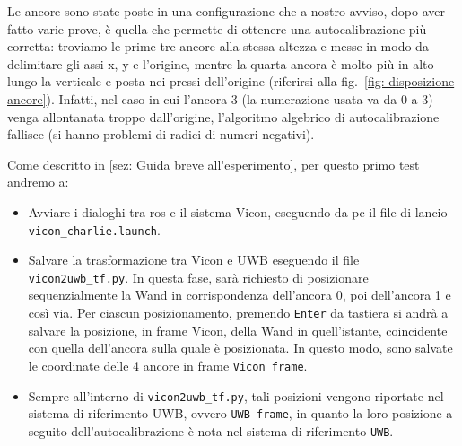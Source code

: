 
Le ancore sono state poste in una configurazione che a nostro avviso, dopo aver fatto varie prove, è quella che permette di ottenere una autocalibrazione più corretta: troviamo le prime tre ancore alla stessa altezza e messe in modo da delimitare gli assi x, y e l'origine, mentre la quarta ancora è molto pi\`u in alto lungo la verticale e posta nei pressi dell'origine (riferirsi alla fig.~\ref{fig: disposizione ancore}).
Infatti, nel caso in cui l'ancora 3 (la numerazione usata va da 0 a 3) venga allontanata troppo dall'origine, l'algoritmo algebrico di autocalibrazione fallisce (si hanno problemi di radici di numeri negativi).

Come descritto in \ref{sez: Guida breve all'esperimento}, per questo primo test andremo a:
\begin{itemize}
	\item Avviare i dialoghi tra ros e il sistema Vicon, eseguendo da pc il file di lancio \verb|vicon_charlie.launch|.
	
	\item Salvare la trasformazione tra Vicon e UWB eseguendo il file \verb|vicon2uwb_tf.py|. In questa fase, sarà richiesto di posizionare sequenzialmente la Wand in corrispondenza dell'ancora 0, poi dell'ancora 1 e così via. 
	Per ciascun posizionamento, premendo \verb|Enter| da tastiera si andrà a salvare la posizione, in frame Vicon, della Wand in quell'istante, coincidente con quella dell'ancora sulla quale è posizionata. In questo modo, sono salvate le coordinate delle 4 ancore in frame \verb|Vicon frame|.
	
	\item Sempre all'interno di \verb|vicon2uwb_tf.py|, tali posizioni vengono riportate nel sistema di riferimento UWB, ovvero \verb|UWB frame|, 
	in quanto la loro posizione a seguito dell'autocalibrazione è nota nel sistema di riferimento \verb|UWB|.
\end{itemize}

